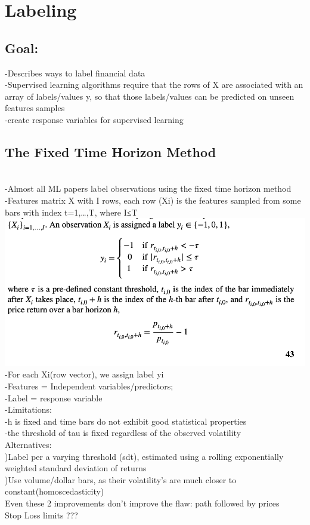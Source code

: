 \documentclass{article}
\begin{document}
\section{Labeling}
\subsection{Goal:\\ }
-Describes ways to label financial data\\ 
-Supervised learning algorithms require that the rows of X are associated with an array of labels/values y, so that those labels/values can be predicted on unseen features samples\\ 
-create response variables for supervised learning\\ 

\subsection{The Fixed Time Horizon Method}\\ 
-Almost all ML papers label observations using the fixed time horizon method\\ 
-Features matrix X with I rows, each row (Xi) is the features sampled from some bars with index t=1,…,T, where  I≤T\\ 
\includegraphics[width=\textwidth]{FixedHorizonMethod.png}\\ 
-For each Xi(row vector), we assign label yi\\ 
-Features = Independent variables/predictors;\\ 
-Label = response variable \\ 
-Limitations:\\ 
	\indent-h is fixed and time bars do not exhibit good statistical properties \\ 
    \indent-the threshold of tau is fixed regardless of the observed volatility\\ 
Alternatives:\\ 
	)Label per a varying threshold (sdt), estimated using a rolling 				  		exponentially weighted standard deviation of returns\\ 
    )Use volume/dollar bars, as their volatility's are much closer to constant(homoscedasticity)\\ 
    \indent Even these 2 improvements don't improve the flaw: path followed by 		    	prices\\ 
 \indent Stop Loss limits ???  \\ 
 
\end{document}
